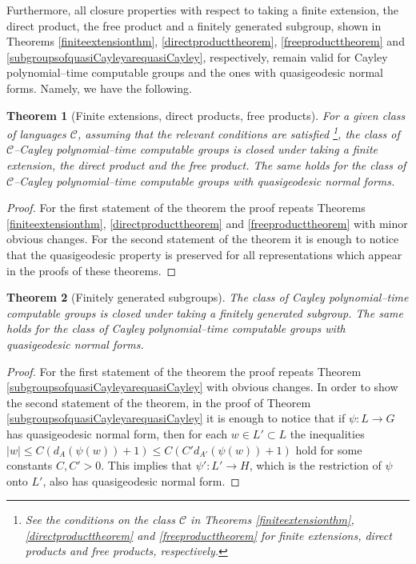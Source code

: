 \documentclass[article,12pt]{elsarticle}
\newtheorem{theorem}{Theorem}
\begin{document}
Furthermore, all closure properties
with respect to taking a finite extension, 
the direct product, the free product and a finitely 
generated subgroup, shown in Theorems \ref{finiteextensionthm}, 
\ref{directproducttheorem}, \ref{freeproducttheorem} 
and \ref{subgroupsofquasiCayleyarequasiCayley}, 
respectively, remain valid 
for Cayley polynomial--time computable groups and 
the ones with quasigeodesic normal forms. Namely, we have the 
following.
\begin{theorem}[Finite extensions, direct products, 
	free products] 
	\label{Finite_extension_DP_FP_CPTC_thm}	 
	For a given class of languages $\mathcal{C}$, 
	assuming that the relevant conditions are 
	satisfied \footnote{See the conditions on the class
		$\mathcal{C}$ in Theorems \ref{finiteextensionthm}, \ref{directproducttheorem} 
		and \ref{freeproducttheorem} for finite extensions,
		direct products and free products, respectively.}, 
	the class of $\mathcal{C}$--Cayley polynomial--time 
	computable groups is closed under 
	taking a finite extension, the direct 
	product and the free product. The same 
	holds for the class of $\mathcal{C}$--Cayley polynomial--time computable groups 
	with quasigeodesic normal forms.  
\end{theorem}
\begin{proof} 
   For the first statement of the theorem 
   the proof repeats Theorems \ref{finiteextensionthm}, 
   \ref{directproducttheorem} and \ref{freeproducttheorem}
   with minor obvious changes. For the second statement 
   of the theorem it is enough to notice that 
   the quasigeodesic property is preserved 
   for all representations which appear in the proofs of these theorems.      
\end{proof}	
  
\begin{theorem}[Finitely generated subgroups]
	\label{fgsubgroups_caypoltime}	
	The class of Cayley 
	polynomial--time computable 
	groups is closed under taking a finitely generated 
	subgroup. The same holds for the class of 
	Cayley polynomial--time computable groups  
	with quasigeodesic normal forms. 
\end{theorem}
\begin{proof}
   For the first statement of the theorem 
   the proof repeats Theorem \ref{subgroupsofquasiCayleyarequasiCayley}
   with obvious changes. 
   In order to show the second statement of the theorem, 
   in the proof of 
   Theorem \ref{subgroupsofquasiCayleyarequasiCayley} 
   it is enough to notice that if 
   $\psi: L \rightarrow G$ has 
   quasigeodesic normal form, 
   then for each $w \in L' \subset L$ the inequalities
   $|w| \leqslant C (d_A (\psi(w)) + 1) 
   \leqslant C (C' d_{A'}(\psi(w)) +1)$ hold
   for some constants $C,C'>0$. This implies that 
   $\psi': L' \rightarrow H$, which is the 
   restriction of $\psi$ onto $L'$, 
   also has quasigeodesic normal form.
\end{proof}	
  
\end{document}
